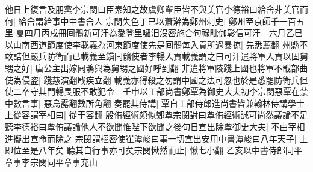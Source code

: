 他日上復言及朋黨李宗閔曰臣素知之故虞卿輩臣皆不與美官李德裕曰給舍非美官而何|{
	給舍謂給事中中書舍人}
宗閔失色丁巳以蕭澣為鄭州刺史|{
	鄭州至京師千一百五里}
夏四月丙戌冊囘鶻新可汗為愛登里囉汨沒密施合句祿毗伽彰信可汗　六月乙巳以山南西道節度使李載義為河東節度使先是囘鶻每入貢所過暴掠|{
	先悉薦翻}
州縣不敢詰但嚴兵防衛而已載義至鎭囘鶻使者李暢入貢載義謂之曰可汗遣將軍入貢以固舅甥之好|{
	唐公主出嫁囘鶻與為舅甥之國好呼到翻}
非遣將軍陵踐上國也將軍不戢部曲使為侵盗|{
	踐慈演翻戢疾立翻}
載義亦得殺之勿謂中國之法可忽也於是悉罷防衛兵但使二卒守其門暢畏服不敢犯令　壬申以工部尚書鄭覃為御史大夫初李宗閔惡覃在禁中數言事|{
	惡烏露翻數所角翻}
奏罷其侍講|{
	覃自工部侍郎進尚書皆兼翰林侍講學士}
上從容謂宰相曰|{
	從于容翻}
殷侑經術頗似鄭覃宗閔對曰覃侑經術誠可尚然議論不足聽李德裕曰覃侑議論他人不欲聞惟陛下欲聞之後旬日宣出除覃御史大夫|{
	不由宰相進擬出宣命而除之}
宗閔謂樞密使崔潭峻曰事一切宣出安用中書潭峻曰八年天子|{
	上即位至是八年矣}
聽其自行事亦可矣宗閔愀然而止|{
	愀七小翻}
乙亥以中書侍郎同平章事李宗閔同平章事充山

